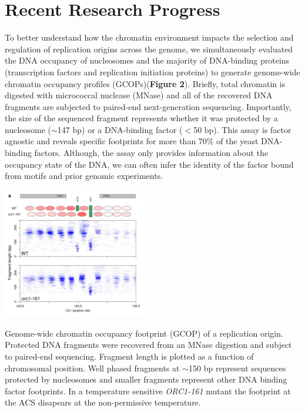 \section{Recent Research Progress}
To better understand how the chromatin environment impacts the selection and regulation of replication origins across the genome, we simultaneously evaluated the DNA occupancy of nucleosomes and the majority of DNA-binding proteins (\eg transcription factors and replication initiation proteins) to generate genome-wide chromatin occupancy profiles (GCOPs)({\color{dukeblue}\textbf{Figure 2}}). Briefly, total chromatin is digested with micrococcal nuclease (MNase) and all of the recovered DNA fragments are subjected to paired-end next-generation sequencing\citep{Belsky2015-li,Henikoff2011-vo}.  Importantly, the size of the sequenced fragment represents whether it was protected by a nucleosome ($\sim$147 bp) or a DNA-binding factor ($<$50 bp). This assay is factor agnostic and reveals specific footprints for more than 70\% of the yeast DNA-binding factors\citep{Henikoff2011-vo}.  Although, the assay only provides information about the occupancy state of the DNA, we can often infer the identity of the factor bound from motifs and prior genomic experiments.  
\begin{floatingfigure}[lt]{2.5in}
\vspace{-8mm}
\begin{center}
\includegraphics[width=2.5in]{r35_figures/orc_chromatin.png}
\end{center}
\vspace{3mm}
\caption{Genome-wide chromatin occupancy footprint (GCOP) of a replication origin.  Protected DNA fragments were recovered from an MNase digestion and subject to paired-end sequencing. Fragment length is plotted as a function of chromosomal position.  Well phased fragments at $\sim$150 bp represent sequences protected by nucleosomes and smaller fragments represent other DNA binding factor footprints.  In a temperature sensitive \textit{ORC1-161} mutant the footprint at the ACS disapears at the non-permissive temperature.}%
\end{floatingfigure}%

